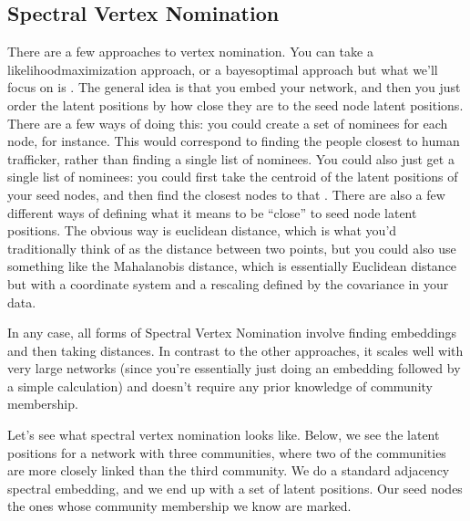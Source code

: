 \documentclass[letterpaper,10pt,english]{jupyterBook}
\begin{document}
\subsection{Spectral Vertex Nomination}
\label{\detokenize{applications/ch8/single-vertex-nomination:spectral-vertex-nomination}}
\sphinxAtStartPar
There are a few approaches to vertex nomination. You can take a likelihood\sphinxhyphen{}maximization approach, or a bayes\sphinxhyphen{}optimal approach \sphinxhyphen{} but what we’ll focus on is . The general idea is that you embed your network, and then you just order the latent positions by how close they are to the seed node latent positions. There are a few ways of doing this: you could create a  set of nominees for each node, for instance. This would correspond to finding the people closest to  human trafficker, rather than finding a single list of nominees. You could also just get a single list of nominees: you could first take the centroid of the latent positions of your seed nodes, and then find the closest nodes to that . There are also a few different ways of defining what it means to be “close” to seed node latent positions. The obvious way is euclidean distance, which is what you’d traditionally think of as the distance between two points, but you could also use something like the Mahalanobis distance, which is essentially Euclidean distance but with a coordinate system and a rescaling defined by the covariance in your data.

\sphinxAtStartPar
In any case, all forms of Spectral Vertex Nomination involve finding embeddings and then taking distances. In contrast to the other approaches, it scales well with very large networks (since you’re essentially just doing an embedding followed by a simple calculation) and doesn’t require any prior knowledge of community membership.

\sphinxAtStartPar
Let’s see what spectral vertex nomination looks like. Below, we see the latent positions for a network with three communities, where two of the communities are more closely linked than the third community. We do a standard adjacency spectral embedding, and we end up with a set of latent positions. Our seed nodes \sphinxhyphen{} the ones whose community membership we know \sphinxhyphen{} are marked.
\end{document}

